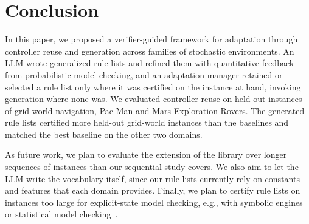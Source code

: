 \section{Conclusion}
\label{sec:conclusion}

In this paper, we proposed a verifier-guided framework for adaptation through controller reuse and generation across families of stochastic environments.
An LLM wrote generalized rule lists and refined them with quantitative feedback from probabilistic model checking, and an adaptation manager retained or selected a rule list only where it was certified on the instance at hand, invoking generation where none was.
We evaluated controller reuse on held-out instances of grid-world navigation, Pac-Man and Mars Exploration Rovers.
The generated rule lists certified more held-out grid-world instances than the baselines and matched the best baseline on the other two domains.

As future work, we plan to evaluate the extension of the library over longer sequences of instances than our sequential study covers.
We also aim to let the LLM write the vocabulary itself, since our rule lists currently rely on constants and features that each domain provides.
Finally, we plan to certify rule lists on instances too large for explicit-state model checking, e.g., with symbolic engines or statistical model checking~\cite{TODO-SMC-or-symbolic-engine}.
